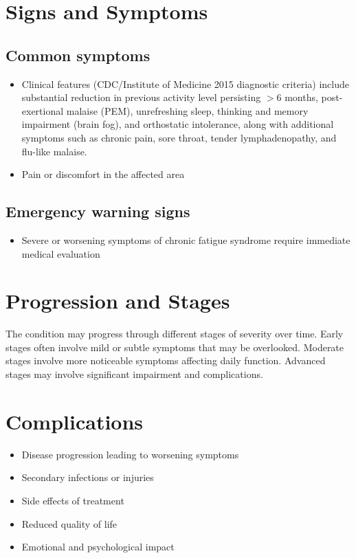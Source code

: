\section{Signs and Symptoms}

\subsection{Common symptoms}
\begin{itemize}[noitemsep]
  \item Clinical features (CDC/Institute of Medicine 2015 diagnostic criteria) include substantial reduction in previous activity level persisting $>$6 months, post-exertional malaise (PEM), unrefreshing sleep, thinking and memory impairment (brain fog), and orthostatic intolerance, along with additional symptoms such as chronic pain, sore throat, tender lymphadenopathy, and flu-like malaise.

  \item Pain or discomfort in the affected area
  \end{itemize}

\subsection{Emergency warning signs}
\begin{itemize}[noitemsep]
  \item Severe or worsening symptoms of chronic fatigue syndrome require immediate medical evaluation
\end{itemize}
\section{Progression and Stages}
The condition may progress through different stages of severity over time. Early stages often involve mild or subtle symptoms that may be overlooked. Moderate stages involve more noticeable symptoms affecting daily function. Advanced stages may involve significant impairment and complications.
\section{Complications}
\begin{itemize}[noitemsep]
  \item Disease progression leading to worsening symptoms
  \item Secondary infections or injuries
  \item Side effects of treatment
  \item Reduced quality of life
  \item Emotional and psychological impact
\end{itemize}
